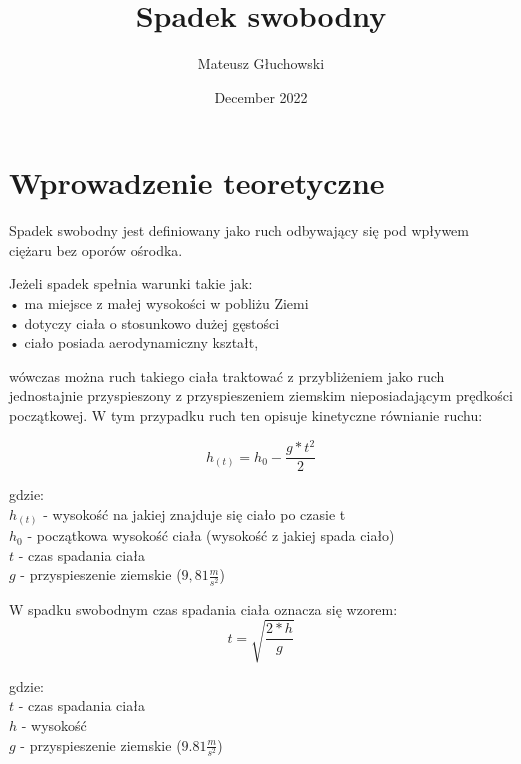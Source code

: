 \documentclass{article}
\title{Spadek swobodny}
\author{Mateusz Głuchowski}
\date{December 2022}
\begin{document}
\maketitle

\section{Wprowadzenie teoretyczne}
\begin{flushleft}
    Spadek swobodny jest definiowany jako ruch odbywający się pod wpływem ciężaru bez oporów ośrodka.
\end{flushleft}

\begin{flushleft}
    
    Jeżeli spadek spełnia warunki takie jak:\\
        \> •	ma miejsce z małej wysokości w pobliżu Ziemi\\
        \> •	dotyczy ciała o stosunkowo dużej gęstości\\
        \> •	ciało posiada aerodynamiczny kształt,\\

\end{flushleft}

\begin{flushleft}
    wówczas można ruch takiego ciała traktować z przybliżeniem jako ruch jednostajnie przyspieszony z przyspieszeniem ziemskim nieposiadającym prędkości początkowej. W tym przypadku ruch ten opisuje kinetyczne równianie ruchu:

    \begin{equation}
        h_{(t)} = h_{0} - \frac{g*t^{2}}{2}
    \end{equation}

    gdzie: \\
    \> $h_{(t)}$ - wysokość na jakiej znajduje się ciało po czasie t \\ 
    \> $h_{0}$ - początkowa wysokość ciała (wysokość z jakiej spada ciało)\\
    \> $t$ - czas spadania ciała \\
    \> $g$ - przyspieszenie ziemskie ($9,81 \frac{m}{s^{2}}$)\\
    
\end{flushleft}

\begin{flushleft}
    W spadku swobodnym czas spadania ciała oznacza się wzorem:
    \begin{equation}
    t = \sqrt{\frac{2*h}{g}}
    \end{equation}

    gdzie: \\
    \> $t$ - czas spadania ciała\\
    \> $h$ - wysokość\\
    \> $g$ - przyspieszenie ziemskie ($9.81 \frac{m}{s^{2}}$) \\
    
\end{flushleft}
\end{document}
